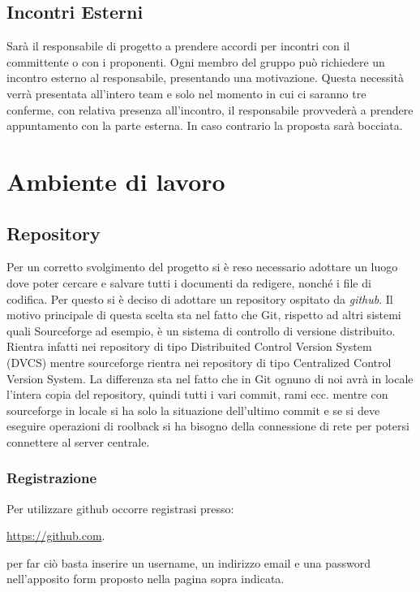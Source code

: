 \subsection{Incontri Esterni}
Sarà il responsabile di progetto a prendere accordi per incontri con il committente o con i proponenti.
Ogni membro del gruppo può richiedere un incontro esterno al responsabile, presentando una motivazione. Questa necessità verrà presentata all'intero team e solo nel momento in cui ci saranno tre conferme, con relativa presenza all'incontro, il responsabile provvederà a prendere appuntamento con la parte esterna. In caso contrario la proposta sarà bocciata.

\newpage
\section{Ambiente di lavoro}
\subsection{Repository}
\label{sec:repository}
Per un corretto svolgimento del progetto si è reso necessario adottare un luogo dove poter cercare e salvare tutti i documenti da redigere, nonché i file di codifica. Per questo si è deciso di adottare un repository ospitato da \textit{github}. Il motivo principale di questa scelta sta nel fatto che Git, rispetto ad altri sistemi quali Sourceforge ad esempio, è un sistema di controllo di versione distribuito. Rientra infatti nei repository di tipo Distribuited Control Version System (DVCS) mentre sourceforge rientra nei repository di tipo Centralized Control Version System. La differenza sta nel fatto che in Git ognuno di noi avrà in locale l'intera copia del repository, quindi tutti i vari commit, rami ecc. mentre con sourceforge in locale si ha solo la situazione dell'ultimo commit e se si deve eseguire operazioni di roolback si ha bisogno della connessione di rete per potersi connettere al server centrale.

\subsubsection{Registrazione}
Per utilizzare github occorre registrasi presso:
\begin{center}
\url{https://github.com}.
\end{center}
per far ciò basta inserire un username, un indirizzo email e una password nell'apposito form proposto nella pagina sopra indicata.

